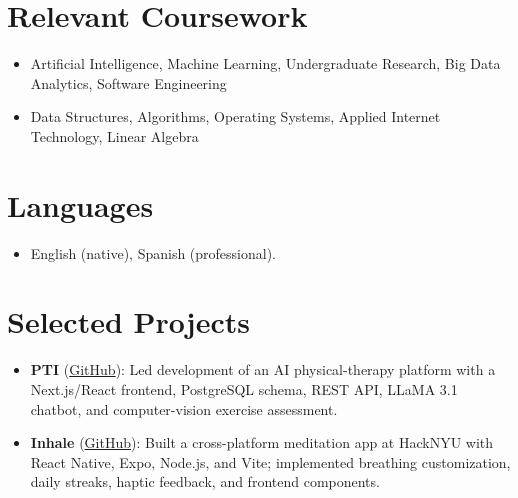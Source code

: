 \documentclass[11pt,a4paper,sans]{moderncv}
\begin{document}

\section{Relevant Coursework}
\vspace{1pt}
\begin{itemize}
\item Artificial Intelligence, Machine Learning, Undergraduate Research, Big Data Analytics, Software Engineering
\item Data Structures, Algorithms, Operating Systems, Applied Internet Technology, Linear Algebra
\end{itemize}


\section{Languages}
\vspace{1pt}
\begin{itemize}
\item English (native), Spanish (professional).
\end{itemize}


\section{Selected Projects}
\vspace{1pt}
\begin{itemize}
\item \textbf{PTI} (\href{https://github.com/kvilleda12/pt}{GitHub}): Led development of an AI physical-therapy platform with a Next.js/React frontend, PostgreSQL schema, REST API, LLaMA 3.1 chatbot, and computer-vision exercise assessment.
\item \textbf{Inhale} (\href{https://github.com/adamsolimancs/Inhale-Breathing-App}{GitHub}): Built a cross-platform meditation app at HackNYU with React Native, Expo, Node.js, and Vite; implemented breathing customization, daily streaks, haptic feedback, and frontend components.
\end{itemize}
\end{document}
